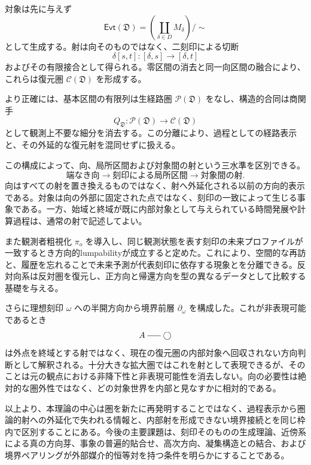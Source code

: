 \documentclass[a4paper,11pt]{ltjsarticle}
\theoremstyle{definition}
\theoremstyle{plain}
\newcommand{\Evt}{\mathsf{Evt}}
\newcommand{\dfix}{\bigcirc}
\newcommand{\dline}{\mathrel{\rule[0.55ex]{1.6em}{0.4pt}}}
\begin{document}
対象は先に与えず
\[
 \boxed{
 \Evt(\mathfrak D)
 =\left(\coprod_{\delta\in D}M_\delta\right)/{\sim}
 }
\]
として生成する。射は向そのものではなく、二刻印による切断
\[
 \boxed{
 \delta[s,t]:[\delta,s]\to[\delta,t]
 }
\]
およびその有限接合として得られる。零区間の消去と同一向区間の融合により、これらは復元圏 $\mathcal C(\mathfrak D)$ を形成する。

より正確には、基本区間の有限列は生経路圏 $\mathcal P(\mathfrak D)$ をなし、構造的合同は商関手
\[
 Q_{\mathfrak D}:
 \mathcal P(\mathfrak D)\longrightarrow
 \mathcal C(\mathfrak D)
\]
として観測上不要な細分を消去する。この分離により、過程としての経路表示と、その外延的な復元射を混同せずに扱える。

この構成によって、向、局所区間および対象間の射という三水準を区別できる。
\[
 \text{端なき向}
 \longrightarrow
 \text{刻印による局所区間}
 \longrightarrow
 \text{対象間の射}.
\]
向はすべての射を置き換えるものではなく、射へ外延化される以前の方向的表示である。対象は向の外部に固定された点ではなく、刻印の一致によって生じる事象である。一方、始域と終域が既に内部対象として与えられている時間発展や計算過程は、通常の射で記述してよい。

また観測者粗視化 $\pi_o$ を導入し、同じ観測状態を表す刻印の未来プロファイルが一致するとき方向的lumpabilityが成立すると定めた。これにより、空間的な再訪と、履歴を忘れることで未来予測が代表刻印に依存する現象とを分離できる。反対向系は反対圏を復元し、正方向と帰還方向を型の異なるデータとして比較する基礎を与える。

さらに理想刻印 $\omega$ への半開方向から境界前層 $\partial_\omega$ を構成した。これが非表現可能であるとき
\[
 A\dline\dfix
\]
は外点を終域とする射ではなく、現在の復元圏の内部対象へ回収されない方向判断として解釈される。十分大きな拡大圏ではこれを射として表現できるが、そのことは元の観点における非降下性と非表現可能性を消去しない。向の必要性は絶対的な圏外性ではなく、どの対象世界を内部と見なすかに相対的である。

以上より、本理論の中心は圏を新たに再発明することではなく、過程表示から圏論的射への外延化で失われる情報と、内部射を形成できない境界接続とを同じ枠内で区別することにある。今後の主要課題は、刻印そのものの生成理論、近傍系による真の方向芽、事象の普遍的貼合せ、高次方向、凝集構造との結合、および境界ペアリングが外部媒介的恒等対を持つ条件を明らかにすることである。



\end{document}
